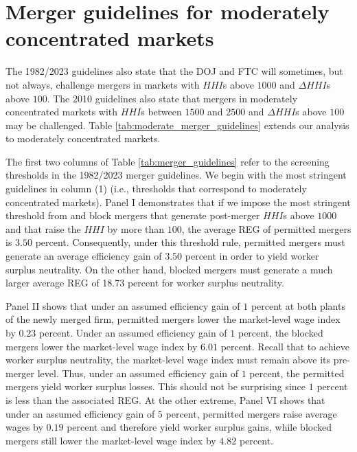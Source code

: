 \documentclass[12pt]{article}
\theoremstyle{prop}
\begin{document}
\clearpage


\section{Merger guidelines for moderately concentrated markets}
\label{app:moderate_concentration}

The 1982/2023 guidelines also state that the DOJ and FTC will sometimes, but not always, challenge mergers in markets with $HHI$s above $1000$ and $\Delta HHI$s above $100$. 
The 2010 guidelines also state that mergers in moderately concentrated markets with $HHI$s between $1500$ and $2500$ and $\Delta HHI$s above $100$ may be challenged. 
Table \ref{tab:moderate_merger_guidelines} extends our analysis to moderately concentrated markets. 


The first two columns of Table \ref{tab:merger_guidelines}  refer to the screening thresholds in the 1982/2023 merger guidelines. 
We begin with the most stringent guidelines in column (1) (i.e., thresholds that correspond to moderately concentrated markets).  
Panel I demonstrates that if we impose the most stringent threshold from \cite{doj1982guidelines} and block mergers that generate post-merger $HHI$s above $1000$ and that raise the $HHI$ by more than $100$, the average REG of permitted mergers is $3.50$ percent. 
Consequently, under this threshold rule, permitted mergers must generate an average efficiency gain of $3.50$ percent in order to yield worker surplus neutrality.  
On the other hand, blocked mergers must generate a much larger average REG of 18.73 percent for worker surplus neutrality. 

Panel II shows that under an assumed efficiency gain of $1$ percent at both plants of the newly merged firm, permitted mergers lower the market-level wage index  by $0.23$ percent. 
Under an assumed efficiency gain of $1$ percent, the blocked mergers lower the market-level wage index by $6.01$ percent.  
Recall that to achieve worker surplus neutrality, the market-level wage index must remain above its pre-merger level. 
Thus, under an assumed efficiency gain of $1$ percent, the permitted mergers yield worker surplus losses. 
This should not be surprising since $1$ percent is less than the associated REG. 
At the other extreme, Panel VI shows that under an assumed efficiency gain of $5$ percent, permitted mergers raise average wages by $0.19$ percent and therefore yield worker surplus gains, while blocked mergers still lower the market-level wage index by $4.82$ percent. 
\end{document}
